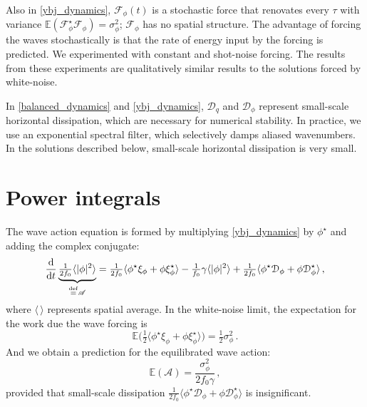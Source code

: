 \documentclass[12pt]{article}
\newcommand{\defn}{\ensuremath{\stackrel{\mathrm{def}}{=}}}
\newcommand{\per}{\, .}
\newcommand{\com}{\, ,}
\def\beq{\begin{equation}}
\def\eeq{\end{equation}}
\newcommand{\half}{\tfrac{1}{2}}
\newcommand{\phis}{\phi^\star}
\def\dd{{\rm d}}
\newcommand{\A}{\mathscr{A}}
\newcommand{\F}{{\mathscr{F}}}
\def\la{\langle}
\def\ra{\rangle}
\newcommand{\?}{\stackrel{?}{=}}
\newcommand{\D}{\mathcal{D}}
\newcommand{\Es}{\mathbb{E}}
\begin{document}
Also in \eqref{ybj_dynamics}, $\F_\phi(t)$ is a stochastic force that renovates
every $\tau$ with variance $\Es(\F_\phis\F_\phi) = \sigma_\phi^2$; $\F_\phi$ has
no spatial structure. The advantage of forcing the waves stochastically is that
the rate of energy input by the forcing is predicted. We experimented
with constant and shot-noise forcing. The results from these experiments are
 qualitatively similar results to the solutions forced by white-noise.

In \eqref{balanced_dynamics} and \eqref{ybj_dynamics}, $\D_q$ and $\D_{\phi}$ represent
small-scale horizontal dissipation, which are necessary for numerical stability.
In practice, we use an exponential spectral filter, which selectively damps aliased
wavenumbers. In the solutions described below, small-scale horizontal dissipation
is very small.

\section{Power integrals}

The wave action equation is formed by multiplying \eqref{ybj_dynamics} by $\phis$ and
adding the complex conjugate:
\beq
\frac{\dd}{\dd t} \underbrace{\tfrac{1}{2 f_0} \la |\phi|^2 \ra}_{\defn \A} = \tfrac{1}{2f_0}\la \phis \xi_\phi +
\phi \xi_\phis \ra -\tfrac{1}{f_0}\gamma \la |\phi|^2 \ra + \tfrac{1}{2f_0} \la \phis\D_\phi + \phi\D_\phis \ra\com
\label{A}
\eeq
where $\la\,\ra$ represents spatial average. In the white-noise limit, the expectation for
the work due the wave forcing is
\beq
\Es\Big(\tfrac{1}{2}\la \phis \xi_\phi+\phi \xi_\phis \ra\Big) = \half\sigma_\phi^2\per
\eeq
And we obtain a prediction for the equilibrated wave action:
\beq
\label{prediced_A}
\Es(\A) = \frac{\sigma_\phi^2}{2 f_0 \gamma}\com
\eeq
provided that small-scale dissipation $\tfrac{1}{2f_0}\la\phis\D_\phi+\phi\D_\phis\ra$
is insignificant.
\end{document}
